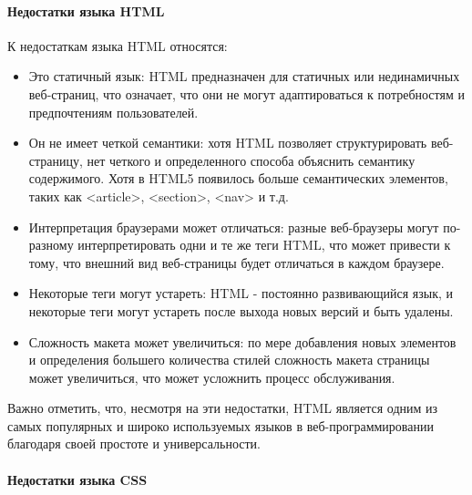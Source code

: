 \paragraph{Недостатки языка HTML}

К недостаткам языка HTML относятся:
\begin{itemize}
	\item Это статичный язык: HTML предназначен для статичных или нединамичных веб-страниц, что означает, что они не могут адаптироваться к потребностям и предпочтениям пользователей.
	\item Он не имеет четкой семантики: хотя HTML позволяет структурировать веб-страницу, нет четкого и определенного способа объяснить семантику содержимого. Хотя в HTML5 появилось больше семантических элементов, таких как <article>, <section>, <nav> и т.д.
	\item Интерпретация браузерами может отличаться: разные веб-браузеры могут по-разному интерпретировать одни и те же теги HTML, что может привести к тому, что внешний вид веб-страницы будет отличаться в каждом браузере.
	\item Некоторые теги могут устареть: HTML - постоянно развивающийся язык, и некоторые теги могут устареть после выхода новых версий и быть удалены.
	\item Сложность макета может увеличиться: по мере добавления новых элементов и определения большего количества стилей сложность макета страницы может увеличиться, что может усложнить процесс обслуживания.
\end{itemize}

Важно отметить, что, несмотря на эти недостатки, HTML является одним из самых популярных и широко используемых языков в веб-программировании благодаря своей простоте и универсальности\cite{Nhtml}.

\paragraph{Недостатки языка CSS}

